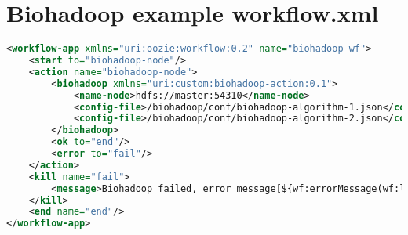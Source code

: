 \section{Biohadoop example workflow.xml}
\begin{lstlisting}[label=lst:biooozie, language=XML]
<workflow-app xmlns="uri:oozie:workflow:0.2" name="biohadoop-wf">
    <start to="biohadoop-node"/>
    <action name="biohadoop-node">
        <biohadoop xmlns="uri:custom:biohadoop-action:0.1">
            <name-node>hdfs://master:54310</name-node>
            <config-file>/biohadoop/conf/biohadoop-algorithm-1.json</config-file>
            <config-file>/biohadoop/conf/biohadoop-algorithm-2.json</config-file>
        </biohadoop>
        <ok to="end"/>
        <error to="fail"/>
    </action>
    <kill name="fail">
        <message>Biohadoop failed, error message[${wf:errorMessage(wf:lastErrorNode())}]</message>
    </kill>
    <end name="end"/>
</workflow-app>
\end{lstlisting}